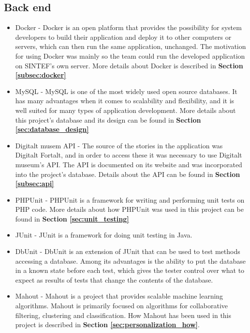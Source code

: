 \subsection{Back end}
\begin{itemize}
	\item Docker \cite{EHW2} - Docker is an open platform that provides the possibility for system developers to build their application and deploy it to other computers or servers, which can then run the same application, unchanged. The motivation for using Docker was mainly so the team could run the developed application on SINTEF's own server. More details about Docker is described in \textbf{Section \ref{subsec:docker}}
	\item MySQL \cite{es8} - MySQL is one of the most widely used open source databases. It has many advantages when it comes to scalability and flexibility, and it is well suited for many types of application development. More details about this project's database and its design can be found in \textbf{Section \ref{sec:database_design}}
	\item Digitalt musem API \cite{digitaltMuseum} - The source of the stories in the application was Digitalt Fortalt, and in order to access these it was necessary to use Digitalt museum's API. The API is documented on its website and was incorporated into the project's database. Details about the API can be found in \textbf{Section \ref{subsec:api}}
	\item PHPUnit \cite{KF2} - PHPUnit is a framework for writing and performing unit tests on PHP code. More details about how PHPUnit was used in this project can be found in \textbf{Section \ref{sec:unit_testing}}
	\item JUnit \cite{jUnit} - JUnit is a framework for doing unit testing in Java. 
	\item DbUnit \cite{dbUnit} - DbUnit is an extension of JUnit that can be used to test methods accessing a database. Among its advantages is the ability to put the database in a known state before each test, which gives the tester control over what to expect as results of tests that change the contents of the database.
	\item Mahout \cite{as9}  - Mahout is a project that provides scalable machine learning algorithms. Mahout is primarily focused on algorithms for collaborative filtering, clustering and classification. How Mahout has been used in this project is described in \textbf{Section \ref{sec:personalization_how}}.
\end{itemize}

